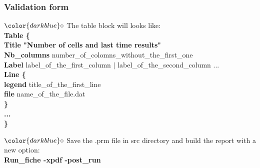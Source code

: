 \documentclass[10pt, hyperref={unicode=true,pdfusetitle, bookmarks=true,bookmarksnumbered=false,bookmarksopen=false, breaklinks=false,pdfborder={0 0 1},backref=true,colorlinks=true,linkcolor=darkblue,pageanchor}]{beamer}
\begin{document}
\begin{frame}
\frametitle{Validation form}
\begin{block}{}

\hspace{1cm} $\color{darkblue}\circ$ {\small{ The table block will looks like:\\
{\footnotesize{
\hspace{1.4cm} \textbf{Table \{} \\
\hspace{1.7cm} \textbf{Title "Number of cells and last time results"} \\
\hspace{1.7cm} \textbf{Nb\_columns} number\_of\_colomns\_without\_the\_first\_one \\
\hspace{1.7cm} \textbf{Label} label\_of\_the\_first\_column $|$ label\_of\_the\_second\_column ...\\
\hspace{1.7cm} \textbf{Line \{} \\
\hspace{2cm} \textbf{legend} title\_of\_the\_first\_line\\
\hspace{2cm} \textbf{file} name\_of\_the\_file.dat\\
\hspace{1.7cm} \textbf{\}} \\
\hspace{1.7cm} \textbf{...} \\
\hspace{1.4cm} \textbf{\}} \\
}}
}}

\hspace{1cm} $\color{darkblue}\circ$ {\small{ Save the .prm file in src directory and build the report with a new option:\\
\hspace{1.4cm} \textbf{Run\_fiche -xpdf -post\_run}
}}

\end{block}
\end{frame}
\end{document}
